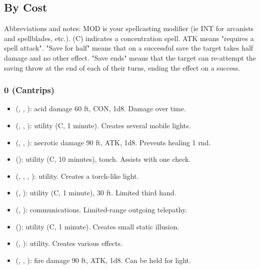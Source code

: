 \subsection{By Cost}
Abbreviations and notes: MOD is your spellcasting modifier (ie INT for arcanists and spellblades, etc.). (C) indicates a concentration spell. ATK means "requires a spell attack". "Save for half" means that on a successful save the target takes half damage and no other effect. "Save ends" means that the target can re-attempt the saving throw at the end of each of their turns, ending the effect on a success.

\subsubsection{0 (Cantrips)}
\begin{itemize}
	\item {} (, , ): acid damage 60 ft, CON, 1d8. Damage over time.
	\item {} (, , ): utility (C, 1 minute). Creates several mobile lights.
	\item {} (, , ): necrotic damage 90 ft, ATK, 1d8. Prevents healing 1 rnd.
	\item {} (): utility (C, 10 minutes), touch. Assists with one check.
	\item {} (, , , ): utility. Creates a torch-like light.
	\item {} (, ): utility (C, 1 minute), 30 ft. Limited third hand.
	\item {} (, ): communications. Limited-range outgoing telepathy.
	\item {} (): utility (C, 1 minute). Creates small static illusion.
	\item {} (, ): utility. Creates various effects.
	\item {} (, , ): fire damage 90 ft, ATK, 1d8. Can be held for light.

\end{itemize}
